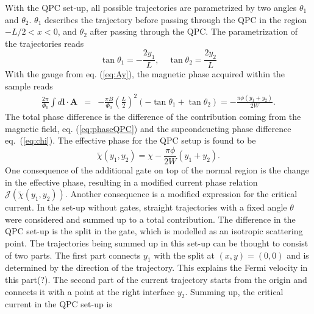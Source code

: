 With the QPC set-up, all possible trajectories are parametrized by two angles $\theta_1$ and $\theta_2$. $\theta_1$ describes the trajectory before passing through the QPC in the region $ -L/2 < x < 0$, and  $\theta_2$ after passing through the QPC. The parametrization of the trajectories reads
\begin{equation}
\tan \theta_1 = - \frac{2 y_1}{L}, \quad \tan \theta_2 = \frac{2 y_2}{L}
\label{eq:QPCparametrization}
\end{equation}
With the gauge from eq. (\ref{eq:Ay}), the magnetic phase acquired within the sample reads
\begin{eqnarray}
\frac{2\pi}{\Phi_0} \int d\mathbf{l} \cdot \mathbf{A}  &=&
-\frac{\pi B}{\Phi_0}\left(\frac{L}{2}\right)^2
\left(-\tan\theta_1 + \tan\theta_2\right) =
-\frac{\pi \phi (y_1+y_2)}{2 W}.
\label{eq:phaseQPC}
\end{eqnarray}
The total phase difference is the difference of the contribution coming from the magnetic field, eq. (\ref{eq:phaseQPC}) and the supcondcucting phase difference eq.~(\ref{eq:chi}). The effective phase for the QPC setup is found to be
\begin{equation}
\tilde{\chi}(y_1,y_2)=\chi-\frac{ \pi \phi }{2W}(y_1+y_2).
\label{eq:chiQPC}
\end{equation}
One consequence of the additional gate on top of the normal region is the change in the effective phase, resulting in a modified current phase relation $\mathcal{J}(\tilde{\chi}(y_1, y_2))$. Another consequence is a modified expression for the critical current. In the set-up without gates, straight trajectories with a fixed angle $\theta$ were considered and summed up to a total contribution. The difference in the QPC set-up is the split in the gate, which is modelled as an isotropic scattering point. The trajectories being summed up in this set-up can be thought to consist of two parts. The first part connects $y_1$ with the split at $(x, y) = (0, 0)$ and is determined by the direction of the trajectory. This explains the Fermi velocity in this part(?). The second part of the current trajectory starts from the origin and connects it with a point at the right interface $y_2$. Summing up, the  critical current in the QPC set-up is
